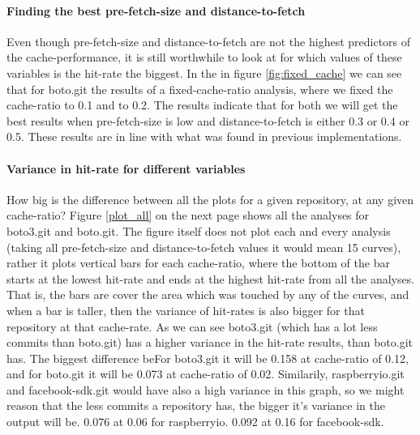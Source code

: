 \documentclass[12pt,twoside,notitlepage]{report}
\begin{document}
\paragraph{Finding the best pre-fetch-size and distance-to-fetch} Even though pre-fetch-size and distance-to-fetch are not the highest predictors of the cache-performance, it is still worthwhile to look at for which values of these variables is the hit-rate the biggest.
In the in figure \ref{fig:fixed_cache} we can see that for boto.git the results of a fixed-cache-ratio analysis, where we fixed the cache-ratio to 0.1 and to 0.2. The results indicate that for both we will get the best results when pre-fetch-size is low and distance-to-fetch is either 0.3 or 0.4 or 0.5. These results are in line with what was found in previous implementations\cite{FixCache}.
\paragraph{Variance in hit-rate for different variables}How big is the difference between all the plots for a given repository, at any given cache-ratio?  Figure \ref{plot_all} on the next page shows all the analyses for boto3.git and boto.git. The figure itself does not plot each and every analysis (taking all pre-fetch-size and distance-to-fetch values it would mean 15 curves), rather it plots vertical bars for each cache-ratio, where the bottom of the bar starts at the lowest hit-rate and ends at the highest hit-rate from all the analyses. That is, the bars are cover the area which was touched by any of the curves, and when a bar is taller, then the variance of hit-rates is also bigger for that repository at that cache-rate. As we can see boto3.git (which has a lot less commits than boto.git) has a higher variance in the hit-rate results, than boto.git has. The biggest difference beFor boto3.git it will be 0.158 at cache-ratio of 0.12, and for boto.git it will be 0.073 at cache-ratio of 0.02. Similarily, raspberryio.git and facebook-sdk.git would have also a high variance in this graph, so we might reason that the less commits a repository has, the bigger it's variance in the output will be. 0.076 at 0.06 for raspberryio. 0.092 at 0.16 for facebook-sdk.
\end{document}
